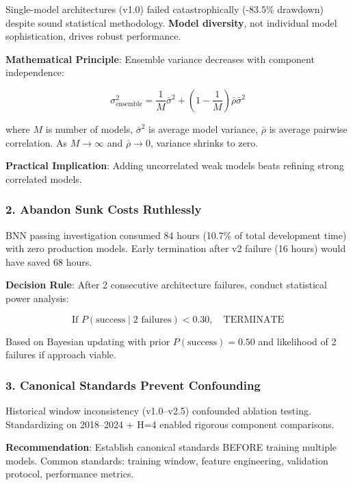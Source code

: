 Single-model architectures (v1.0) failed catastrophically (-83.5\% drawdown) despite sound statistical methodology. \textbf{Model diversity}, not individual model sophistication, drives robust performance.

\textbf{Mathematical Principle}: Ensemble variance decreases with component independence:

\begin{equation}
\sigma^2_{\text{ensemble}} = \frac{1}{M} \bar{\sigma}^2 + \left(1 - \frac{1}{M}\right) \bar{\rho} \bar{\sigma}^2
\end{equation}

where $M$ is number of models, $\bar{\sigma}^2$ is average model variance, $\bar{\rho}$ is average pairwise correlation. As $M \to \infty$ and $\bar{\rho} \to 0$, variance shrinks to zero.

\textbf{Practical Implication}: Adding uncorrelated weak models beats refining strong correlated models.

\subsubsection{2. Abandon Sunk Costs Ruthlessly}

BNN passing investigation consumed 84 hours (10.7\% of total development time) with zero production models. Early termination after v2 failure (16 hours) would have saved 68 hours.

\textbf{Decision Rule}: After 2 consecutive architecture failures, conduct statistical power analysis:

\begin{equation}
\text{If } P(\text{success} \mid \text{2 failures}) < 0.30, \quad \text{TERMINATE}
\end{equation}

Based on Bayesian updating with prior $P(\text{success}) = 0.50$ and likelihood of 2 failures if approach viable.

\subsubsection{3. Canonical Standards Prevent Confounding}

Historical window inconsistency (v1.0--v2.5) confounded ablation testing. Standardizing on 2018--2024 + H=4 enabled rigorous component comparisons.

\textbf{Recommendation}: Establish canonical standards BEFORE training multiple models. Common standards: training window, feature engineering, validation protocol, performance metrics.

